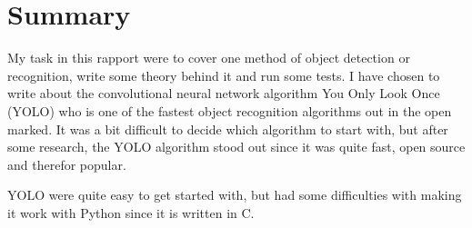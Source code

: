 \newpage
\section*{Summary}
My task in this rapport were to cover one method of object detection or recognition, write some theory behind it and run some tests. I have chosen to write about the convolutional neural network algorithm You Only Look Once (YOLO) who is one of the fastest object recognition algorithms out in the open marked. It was a bit difficult to decide which algorithm to start with, but after some research, the YOLO algorithm stood out since it was quite fast, open source and therefor popular. 

YOLO were quite easy to get started with, but had some difficulties with making it work with Python since it is written in C.